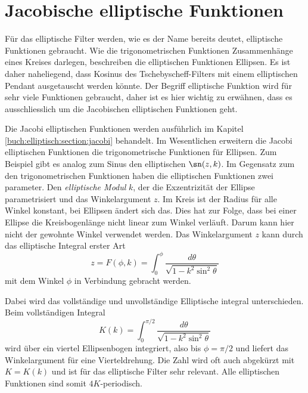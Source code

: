 \section{Jacobische elliptische Funktionen}


Für das elliptische Filter werden, wie es der Name bereits deutet, elliptische Funktionen gebraucht.
Wie die trigonometrischen Funktionen Zusammenhänge eines Kreises darlegen, beschreiben die elliptischen Funktionen Ellipsen.
Es ist daher naheliegend, dass Kosinus des Tschebyscheff-Filters mit einem elliptischen Pendant ausgetauscht werden könnte.
Der Begriff elliptische Funktion wird für sehr viele Funktionen gebraucht, daher ist es hier wichtig zu erwähnen, dass es ausschliesslich um die Jacobischen elliptischen Funktionen geht.

Die Jacobi elliptischen Funktionen werden ausführlich im Kapitel \ref{buch:elliptisch:section:jacobi} behandelt.
Im Wesentlichen erweitern die Jacobi elliptischen Funktionen die trigonometrische Funktionen für Ellipsen.
Zum Beispiel gibt es analog zum Sinus den elliptischen $\sn(z, k)$.
Im Gegensatz zum den trigonometrischen Funktionen haben die elliptischen Funktionen zwei parameter.
Den \textit{elliptische Modul} $k$, der die Exzentrizität der Ellipse parametrisiert und das Winkelargument $z$.
Im Kreis ist der Radius für alle Winkel konstant, bei Ellipsen ändert sich das.
Dies hat zur Folge, dass bei einer Ellipse die Kreisbogenlänge nicht linear zum Winkel verläuft.
Darum kann hier nicht der gewohnte Winkel verwendet werden.
Das Winkelargument $z$ kann durch das elliptische Integral erster Art
\begin{equation}
    z
    =
    F(\phi, k)
    =
    \int_{0}^{\phi}
    \frac{
        d\theta
    }{
        \sqrt{
            1-k^2 \sin^2 \theta
        }
    }
\end{equation}
mit dem Winkel $\phi$ in Verbindung gebracht werden.

Dabei wird das vollständige und unvollständige Elliptische integral unterschieden.
Beim vollständigen Integral
\begin{equation}
    K(k)
    =
    \int_{0}^{\pi / 2}
    \frac{
        d\theta
    }{
        \sqrt{
            1-k^2 \sin^2 \theta
        }
    }
\end{equation}
wird über ein viertel Ellipsenbogen integriert, also bis $\phi=\pi/2$ und liefert das Winkelargument für eine Vierteldrehung.
Die Zahl wird oft auch abgekürzt mit $K = K(k)$ und ist für das elliptische Filter sehr relevant.
Alle elliptischen Funktionen sind somit $4K$-periodisch.

